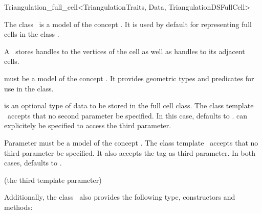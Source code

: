 \begin{ccRefClass}{Triangulation_full_cell<TriangulationTraits, Data, TriangulationDSFullCell>}

\ccDefinition

The class \ccRefName\ is a model of the concept . It
is used by default for representing full cells in the class
.

A \ccRefName\ stores handles to the vertices of the cell as well as handles
to its adjacent cells.


\ccParameters

 must be a model of the concept . It
provides geometric types and predicates for use in the
 class.

 is an optional type of data to be stored in the full cell class. The
class template \ccRefName\ accepts that no second parameter be specified. In
this case,  defaults to .
 can explicitely be specified to access the third parameter.

Parameter  must be a model of the concept
.
The class template \ccRefName\ accepts that no third parameter be specified.
It also accepts the tag  as third parameter. In both
cases,  defaults to .

\ccInheritsFrom

 (the third template parameter)

\ccIsModel


Additionally, the class \ccRefName\ also provides the following type,
constructors and methods:

\ccTypes


\ccCreation
{}



\end{ccRefClass}
